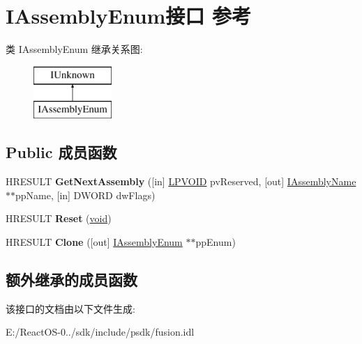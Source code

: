 \hypertarget{interface_i_assembly_enum}{}\section{I\+Assembly\+Enum接口 参考}
\label{interface_i_assembly_enum}
类 I\+Assembly\+Enum 继承关系图\+:\begin{figure}[H]
\begin{center}
\leavevmode
\includegraphics[height=2.000000cm]{interface_i_assembly_enum}
\end{center}
\end{figure}
\subsection*{Public 成员函数}
\begin{DoxyCompactItemize}
\item 
\mbox{\label{interface_i_assembly_enum_aad5ec2665b7818170f096ee290513eaa}} 
H\+R\+E\+S\+U\+LT {\bfseries Get\+Next\+Assembly} (\mbox{[}in\mbox{]} \hyperlink{interfacevoid}{L\+P\+V\+O\+ID} pv\+Reserved, \mbox{[}out\mbox{]} \hyperlink{interface_i_assembly_name}{I\+Assembly\+Name} $\ast$$\ast$pp\+Name, \mbox{[}in\mbox{]} D\+W\+O\+RD dw\+Flags)
\item 
\mbox{\label{interface_i_assembly_enum_a37f9f215bab5fdbcea712d92aad60351}} 
H\+R\+E\+S\+U\+LT {\bfseries Reset} (\hyperlink{interfacevoid}{void})
\item 
\mbox{\label{interface_i_assembly_enum_a5cf3bcbb6eb073170f8f373013bf686a}} 
H\+R\+E\+S\+U\+LT {\bfseries Clone} (\mbox{[}out\mbox{]} \hyperlink{interface_i_assembly_enum}{I\+Assembly\+Enum} $\ast$$\ast$pp\+Enum)
\end{DoxyCompactItemize}
\subsection*{额外继承的成员函数}


该接口的文档由以下文件生成\+:\begin{DoxyCompactItemize}
\item 
E\+:/\+React\+O\+S-\/0../sdk/include/psdk/fusion.\+idl\end{DoxyCompactItemize}
